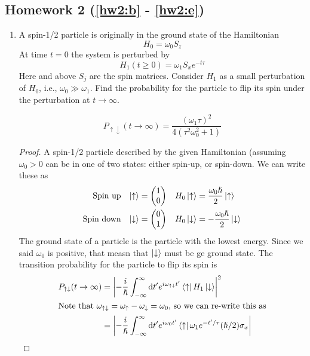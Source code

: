 \documentclass[a4paper]{article}
\begin{document}
\subsection{Homework 2 (\ref{hw2:b} - \ref{hw2:e})}
\begin{enumerate}
\item A spin-1/2 particle is originally in the ground state of the Hamiltonian
	\[ H_0 = \omega_0 S_z \]
At time $t=0$ the system is perturbed by
	\[ H_1(t\geq0) = \omega_1S_xe^{-t\tau} \]
Here and above $S_j$ are the spin matrices. Consider $H_1$ as a small
perturbation of $H_0$, i.e., $\omega_0\gg\omega_1$. Find the probability for
the particle to flip its spin under the perturbation at $t\to\infty$.
\begin{ans}
	\[ P_{\uparrow\downarrow} (t\to\infty) =
	\frac{(\omega_1\tau)^2}{4(\tau^2\omega_0^2+1)}\]
\begin{proof}
	A spin-1/2 particle described by the given Hamiltonian (assuming
	$\omega_0>0$ can be in one of two states: either spin-up, or spin-down.
	We can write these as
	\begin{align*}
		\text{Spin up} 
			&& \left\lvert \uparrow\right\rangle &= \begin{pmatrix}1\\0\end{pmatrix}
			& H_0\left\lvert \uparrow\right\rangle &= \frac{\omega_0\hslash}{2}
				\left\lvert \uparrow\right\rangle\\
		\text{Spin down} 
			&& \left\lvert \downarrow\right\rangle &= 
				\begin{pmatrix}0\\1\end{pmatrix}
			& H_0\left\lvert \downarrow\right\rangle &= -\frac{\omega_0\hslash}{2}
				\left\lvert \downarrow\right\rangle\\
	\end{align*}
	The ground state of a particle is the particle with the lowest energy.
	Since we said $\omega_0$ is positive, that measn that
	$\left\lvert \downarrow\right\rangle$ must be ge ground state. The transition probability
	for the particle to flip its spin is
	\begin{align*}
		P_{\uparrow\downarrow}(t\to\infty) &= \left\lvert 
			-\frac{i}{\hslash} \int_{-\infty}^\infty\mathrm{d} t'
			e^{i\omega_{\uparrow\downarrow}t'}
			\left\langle \uparrow \right\rvert H_1\left\lvert \downarrow\right\rangle\right\rvert^2\\
	\intertext{Note that \(\omega_{\uparrow\downarrow} = \omega_{\uparrow}
	-\omega_{\downarrow} = \omega_0\), so we can re-write this as}
		&= \left\lvert  -\frac{i}{\hslash} \int_{-\infty}^\infty\mathrm{d} t'
			e^{i\omega_0t'} \left\langle \uparrow \right\rvert
			\omega_1e^{-t'/\tau}(\hslash/2)\sigma_x
\right\rvert
\end{align*}
\end{proof}
\end{ans}
\end{enumerate}
\end{document}
